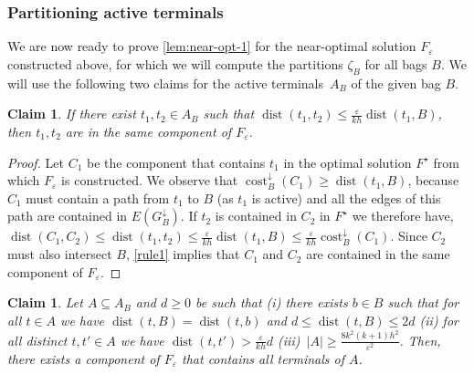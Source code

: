 \documentclass[a4paper]{article}
\theoremstyle{plain}
\newtheorem{claim}[theorem]{Claim}%
\newcommand{\eps}{{\varepsilon}}
\DeclareMathOperator{\cost}{cost}
\DeclareMathOperator{\dist}{dist}
\begin{document}
%
%

\subsubsection{Partitioning active terminals}

We are now ready to prove \autoref{lem:near-opt-1} for the near-optimal solution $F_\eps$ constructed above, for which we will compute the partitions $\zeta_B$ for all bags $B$.
We will use the following two claims for the active terminals~$A_B$ of the given bag $B$.

\begin{claim}\label{claim:1}%
If there exist $t_1,t_2\in A_B$ such that $\dist(t_1,t_2)\le \frac{\eps}{kh}\dist(t_1,B)$, then $t_1,t_2$ are in the same component of $F_\eps$.
\end{claim}

%
\begin{proof}%
Let $C_1$ be the component that contains $t_1$ in the optimal
solution $F^\star$ from which $F_\eps$ is constructed. We observe that
$\cost^\downarrow_{B}(C_1)\ge \dist(t_1,B)$, because~$C_1$ must contain a path
from $t_1$ to $B$ (as $t_1$ is active) and all the edges of this path are
contained in $E(G_{B}^\downarrow)$. If $t_2$ is contained in $C_2$ in $F^\star$
we therefore have, $\dist(C_1,C_2)\le \dist(t_1,t_2)\le
\frac{\eps}{kh}\dist(t_1,B) \le \frac{\eps}{kh} \cost^\downarrow_{B}(C_1)$.
Since $C_2$ must also intersect $B$, \autoref{rule1} implies that $C_1$ and
$C_2$ are contained in the same component of $F_\eps$.  \end{proof}   
%

\begin{claim}\label{claim:2} %
    Let $A\subseteq A_B$ and $d\ge 0$ be such that (i) there exists $b\in B$ such that for all $t\in A$ we have $\dist(t,B)=\dist(t,b)$ and $d\le \dist(t,B)\le 2d$ (ii) for all distinct $t,t'\in A$ we have $\dist(t,t')> \frac{\eps}{kh}d$ (iii)~$|A|\ge \frac{8k^2(k+1)h^2}{\eps^2}$. Then, there exists a component of $F_\eps$ that contains all terminals of $A$.
\end{claim}
\end{document}
